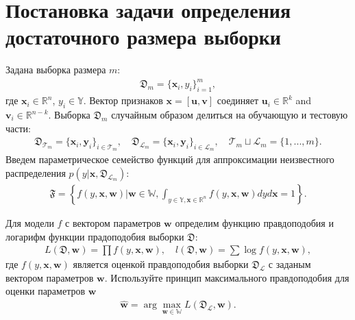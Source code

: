 \section{Постановка задачи определения достаточного размера выборки}

Задана выборка размера $m$:
\[
\label{eq:ps:1}
\begin{aligned}
	\mathfrak{D}_{m} = \{\textbf{x}_i, y_i\}_{i = 1}^{m},
\end{aligned}
\]
где $\textbf{x}_i\in \mathbb{R}^{n}$, $y_i\in \mathbb{Y}$. Вектор признаков $\textbf{x} = [\textbf{u}, \textbf{v}]$ соединяет $\textbf{u}_i\in \mathbb{R}^{k}$ and $ \textbf{v}_i\in \mathbb{R}^{n-k}$.
Выборка $\mathfrak{D}_{m}$ случайным образом делиться на обучающую и тестовую части:
\[
\label{eq:ps:2}
\begin{aligned}
	\mathfrak{D}_{\mathcal{T}_{m}} = \{\textbf{x}_i, \textbf{y}_i\}_{i \in \mathcal{T}_{m}}, \quad \mathfrak{D}_{\mathcal{L}_{m}} = \{\textbf{x}_i, \textbf{y}_i\}_{i \in \mathcal{L}_{m}}, \quad  \mathcal{T}_{m}\sqcup\mathcal{L}_{m} = \{1, ..., m\}.
\end{aligned}
\]
Введем параметрическое семейство функций для аппроксимации неизвестного распределения $p(y|\textbf{x}, \mathfrak{D}_{\mathcal{L}_{m}})$:
\[
\label{eq:ps:3}
\begin{aligned}
	\mathfrak{F} = \left\{f\left(y,\textbf{x}, \textbf{w}\right)|\textbf{w}\in\mathbb{W}, \int_{y\in \mathbb{Y}, \textbf{x}\in\mathbb{R}^{n}}f\left(y, \textbf{x}, \textbf{w}\right)dyd\textbf{x}=1\right\}.
\end{aligned}
\]

Для модели $f$ с вектором параметров $\textbf{w}$ определим функцию правдоподобия и логарифм функции прадоподобия выборки $\mathfrak{D}$:
\[
\label{eq:ps:4}
\begin{aligned}
	L\left(\mathfrak{D}, \textbf{w}\right) = \prod f\left(y,\textbf{x}, \textbf{w}\right),\quad l\left(\mathfrak{D}, \textbf{w}\right) = \sum \log f\left(y,\textbf{x}, \textbf{w}\right),
\end{aligned}
\]
где $f(y,\textbf{x}, \textbf{w})$ является оценкой правдоподобия выборки $\mathfrak{D}_{\mathcal{L}}$ с заданым вектором параметров $\textbf{w}$.
Используйте принцип максимального правдоподобия для оценки параметров $\textbf{w}$
\[
\label{eq:ps:5}
\begin{aligned}
	\hat{\textbf{w}} = \arg\max_{\textbf{w}\in\mathbb{W}}L\left(\mathfrak{D}_{\mathcal{L}}, \textbf{w}\right).
\end{aligned}
\]


